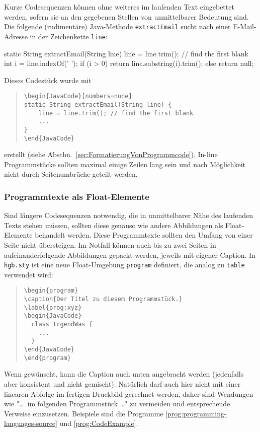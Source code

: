 Kurze Codesequenzen können ohne weiteres im laufenden Text
eingebettet werden, sofern sie an den gegebenen Stellen von unmittelbarer
Bedeutung sind. Die folgende (rudimentäre) Java-Methode \texttt{extractEmail} sucht
nach einer E-Mail-Adresse in der Zeichenkette
\texttt{line}:
%
\begin{JavaCode}[numbers=none]
static String extractEmail(String line) {
    line = line.trim(); // find the first blank
    int i = line.indexOf(' '); 
    if (i > 0)
        return line.substring(i).trim();
    else
        return null;
}
\end{JavaCode}
\medskip

\noindent
Dieses Codestück wurde mit 
%
\begin{quote}
\begin{verbatim}
\begin{JavaCode}[numbers=none]
static String extractEmail(String line) {
    line = line.trim(); // find the first blank
    ...
}
\end{JavaCode}
\end{verbatim}
\end{quote}
%
erstellt (siehe Abschn.\ \ref{sec:FormatierungVonProgrammcode}). 
In-line Programmstücke sollten maximal einige Zeilen lang sein und 
nach Möglichkeit nicht durch Seitenumbrüche geteilt werden.


\subsubsection{Programmtexte als Float-Elemente}
Sind längere Codesequenzen notwendig, die in unmittelbarer Nähe des laufenden Texts
stehen müssen, sollten diese genauso wie andere Abbildungen als Float-Elemente
behandelt werden. Diese Programmtexte sollten den Umfang von einer Seite nicht übersteigen.
Im Notfall können auch bis zu zwei Seiten in aufeinanderfolgende Abbildungen gepackt werden,
jeweils mit eigener Caption. In \texttt{hgb.sty} ist eine neue Float-Umgebung \texttt{program} definiert, die analog zu \texttt{table} verwendet wird:
%
\begin{quote}
\begin{verbatim}
\begin{program}
\caption{Der Titel zu diesem Programmstück.}
\label{prog:xyz}
\begin{JavaCode}
  class IrgendWas {
    ...
  }
\end{JavaCode}
\end{program}
\end{verbatim}
\end{quote}
%
Wenn gewünscht, kann die Caption auch unten angebracht werden 
(jedenfalls aber konsistent und nicht gemischt).
Natürlich darf auch hier nicht mit einer linearen Abfolge im fertigen
Druckbild gerechnet werden, daher sind Wendungen wie
"\ldots\ im folgenden Programmstück \ldots" zu vermeiden und entsprechende Verweise
einzusetzen. Beispiele sind die Programme \ref{prog:programming-languages-source} und \ref{prog:CodeExample}.

